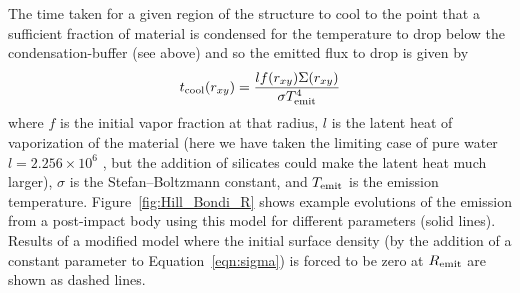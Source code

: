 \documentclass[sn-nature]{sn-jnl}%
\def\mnras{Mon. Not. R. Astron. Soc.}
\begin{document}
%
The time taken for a given region of the structure to cool to the point that a sufficient fraction of material is condensed for the temperature to drop below the condensation-buffer (see above) and so the emitted flux to drop is given by
%
\begin{equation}
    t_{\rm cool} (r_{xy})=\frac{l f(r_{xy}) \Sigma(r_{xy})}{\sigma T^4_{\rm emit}}
\end{equation}
%
where $f$ is the initial vapor fraction at that radius, $l$ is the latent heat of vaporization of the material (here we have taken the limiting case of pure water $l=2.256\times 10^6$ \cite{Chase1998}, but the addition of silicates could make the latent heat much larger), $\sigma$ is the Stefan–Boltzmann constant, and $T_{\rm emit}$ is the emission temperature. Figure~\ref{fig:Hill_Bondi_R} shows example evolutions of the emission from a post-impact body using this model for different parameters (solid lines). Results of a modified model where the initial surface density (by the addition of a constant parameter to Equation~\ref{eqn:sigma}) is forced to be zero at $R_{\rm emit}$ are shown as dashed lines.




\clearpage





\end{document}
